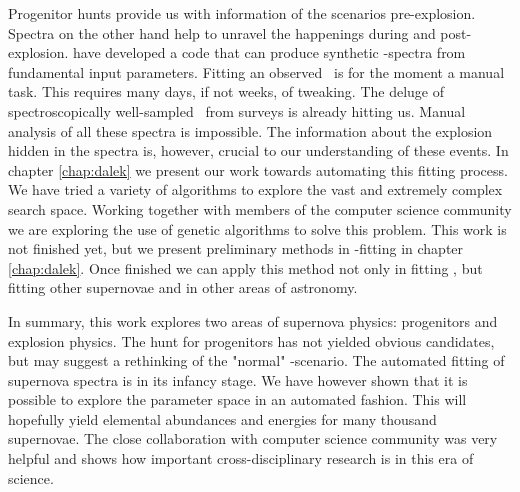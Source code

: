 Progenitor hunts provide us with information of the scenarios pre-explosion. Spectra on the other hand help to unravel the happenings during and post-explosion. \cite{2008MNRAS.386.1897M} have developed a code that can produce synthetic \snia-spectra from fundamental input parameters. Fitting an observed \snia\ is for the moment a manual task. This requires many days, if not weeks, of tweaking. The deluge of spectroscopically well-sampled \sneia\ from surveys is already hitting us. Manual analysis of all these spectra is impossible. The information about the explosion hidden in the spectra is, however, crucial to our understanding of these events. In chapter \ref{chap:dalek} we present our work towards automating this fitting process. We have tried a variety of algorithms to explore the vast and extremely complex search space. Working together with members of the computer science community we are exploring the use of genetic algorithms to solve this problem. 
This work is not finished yet, but we present preliminary methods in \snia-fitting in chapter \ref{chap:dalek}. Once finished we can apply this method not only in fitting \snia, but fitting other supernovae and in other areas of astronomy. 

In summary, this work explores two areas of supernova physics: progenitors and explosion physics. The hunt for progenitors has not yielded obvious candidates, but may suggest a rethinking of the "normal" \sd-scenario. The automated fitting of supernova spectra is in its infancy stage. We have however shown that it is possible to explore the parameter space in an automated fashion. This will hopefully yield elemental abundances and energies for many thousand supernovae. The close collaboration with computer science community was very helpful and shows how important cross-disciplinary research is in this era of science. 


